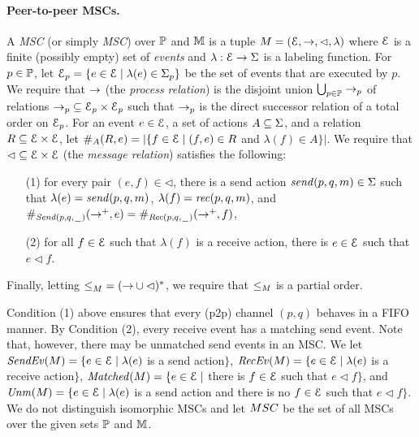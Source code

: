 \documentclass[a4paper,UKenglish,cleveref, autoref, thm-restate]{lipics-v2021}
\begin{document}
\paragraph*{Peer-to-peer MSCs.}
A \emph{\pp MSC} (or simply \emph{MSC}) over $\Procs$ and $\Msg$ is a tuple $\msc = (\Events,\procrel,\lhd,\lambda)$
where $\Events$ is a finite (possibly empty) set of \emph{events}
and $\lambda: \Events \to \Act$ is a labeling function.
For $p \in \Procs$, let $\Events_p = \{e \in \Events \mid \lambda(e) \in \pAct{p}\}$ be the set of events
that are executed by $p$.
We require that $\procrel$ (the \emph{process relation}) is the disjoint union $\bigcup_{p \in \Procs} \procrel_p$
of relations ${\procrel_p} \subseteq \Events_p \times \Events_p$ such that
$\procrel_p$ is the direct successor relation of a total order on $\Events_p$.
For an event $e \in \Events$, a set of actions $A \subseteq \Act$, and a relation $\rel \subseteq \Events \times \Events$,
let $\sametype{e}{A}{\rel} = |\{f \in \Events \mid (f,e) \in \rel$ and $\lambda(f) \in A\}|$.
We require that ${\lhd} \subseteq \Events \times \Events$ (the \emph{message relation}) satisfies the following:
\begin{itemize}\itemsep=0.5ex
\item[(1)] for every pair $(e,f) \in {\lhd}$, there is a send action $\sact{p}{q}{\msg} \in \Act$ such that
$\lambda(e) = \sact{p}{q}{\msg}$, $\lambda(f) = \ract{p}{q}{\msg}$, and
$\sametype{e}{\pqsAct{p}{q}}{\procrel^+} = \sametype{f}{\pqrAct{p}{q}}{\procrel^+}$,
\item[(2)] for all $f \in \Events$ such that $\lambda(f)$ is a receive action, there is $e \in \Events$ such that $e \lhd f$.
\end{itemize}
Finally, letting ${\le}_\msc = ({\procrel} \cup {\lhd})^\ast$,
we require that $\le_\msc$ is a partial order.

\medskip

Condition (1) above ensures that every (p2p) channel $(p,q)$ behaves in a FIFO manner.
By Condition (2), every receive event has a matching send event.
Note that, however, there may be unmatched send events in an MSC.
We let
$\SendEv{\msc} = \{e \in \Events \mid \lambda(e)$ is a send
action$\}$,
$\RecEv{\msc} = \{e \in \Events \mid \lambda(e)$ is a receive
action$\}$,
$\Matched{\msc} = \{e \in \Events \mid$ there is $f \in \Events$
such that $e \lhd f\}$, and
$\Unm{\msc} = \{e \in \Events \mid \lambda(e)$ is a send
action and there is no $f \in \Events$ such that $e \lhd f\}$.
%
We do not distinguish isomorphic MSCs and
let $\ppMSCs$ be the set of all MSCs over the given sets $\Procs$ and $\Msg$.
\end{document}
